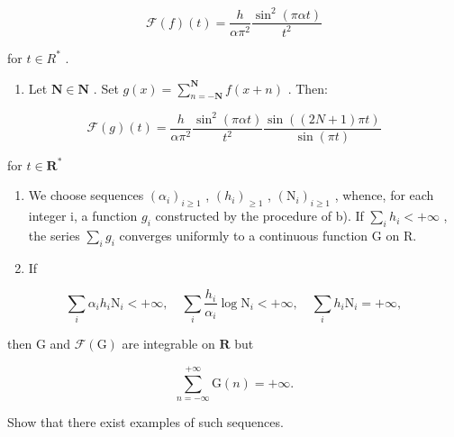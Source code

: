 \[
\mathcal {F} (f) (t) = \frac {h}{\alpha \pi^ {2}} \frac {\sin^ {2} (\pi \alpha t)}{t ^ {2}}
\]

for \(t \in R^{*}\) .

\begin{enumerate}
\def\labelenumi{\alph{enumi})}
\setcounter{enumi}{1}
\tightlist
\item
  Let \(\mathbf{N} \in \mathbf{N}\) . Set \(g(x) = \sum_{n=-\mathbf{N}}^{\mathbf{N}} f(x + n)\) . Then:
\end{enumerate}

\[
\mathcal {F} (g) (t) = \frac {h}{\alpha \pi^ {2}} \frac {\sin^ {2} (\pi \alpha t)}{t ^ {2}} \frac {\sin ((2 N + 1) \pi t)}{\sin (\pi t)}
\]

for \(t\in \mathbf{R}^*\)

\begin{enumerate}
\def\labelenumi{\alph{enumi})}
\setcounter{enumi}{2}
\item
  We choose sequences \((\alpha_{i})_{i\geqslant1}\) , \((h_{i})_{\geqslant1}\) , \((\mathrm{N}_{i})_{i\geqslant1}\) , whence, for each integer i, a function \(g_{i}\) constructed by the procedure of b). If \(\sum_{i} h_{i} < +\infty\) , the series \(\sum_{i} g_{i}\) converges uniformly to a continuous function G on R.
\item
  If
\end{enumerate}

\[
\sum_ {i} \alpha_ {i} h _ {i} \mathrm{N} _ {i} <   + \infty , \quad \sum_ {i} \frac {h _ {i}}{\alpha_ {i}} \log \mathrm{N} _ {i} <   + \infty , \quad \sum_ {i} h _ {i} \mathrm{N} _ {i} = + \infty ,
\]

then G and \(\mathcal{F}(\mathrm{G})\) are integrable on \(\mathbf{R}\) but

\[
\sum_ {n = - \infty} ^ {+ \infty} \mathrm{G} (n) = + \infty .
\]

Show that there exist examples of such sequences.

